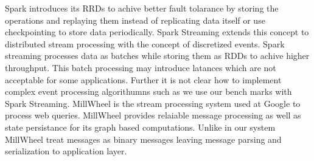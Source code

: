 Spark\cite{zaharia2010spark} introduces its RRDs\cite{zaharia2012resilient} to achive better fault tolarance by storing the operations and replaying them instead of replicating data itself or use checkpointing to store data periodically. Spark Streaming\cite{zaharia2013discretized} extends this concept to distributed stream processing with the concept of discretized events. Spark streaming\cite{zaharia2013discretized} processes data as batches while storing them as RDDs \cite{zaharia2012resilient} to achive higher throughput. This batch processing may introduce latances which are not acceptable for some applications. Further it is not clear how to implement complex event processing algorithumns such as we use our bench marks with Spark Streaming. MillWheel\cite{akidau2013millwheel} is the stream processing system used at Google to process web queries. MillWheel\cite{akidau2013millwheel} provides relaiable message processing as well as state persistance for its graph based computations. Unlike in our system MillWheel treat messages as binary 
messages leaving message parsing and serialization to application layer. 

